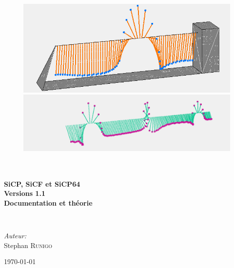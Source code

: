 \begin{titlepage}
\begin{center}
\begin{figure}[htbp]
\begin{minipage}[c]{.45\linewidth}
\begin{center}
\includegraphics[scale=0.25]{./titre/SiCP64}
\end{center}
\end{minipage}
\hfill
\begin{minipage}[c]{.45\linewidth}
\begin{center}
\includegraphics[scale=0.25]{./titre/SiCP}
\end{center}
\end{minipage}
\end{figure}

\textsc{\Large }\\[0.5cm]

\HRule \\[0.4cm]

{\huge \bfseries  SiCP, SiCF et SiCP64\\
  Versions 1.1\\
Documentation et théorie\\[0.4cm] }

\HRule \\[1.5cm]

\begin{minipage}{0.4\textwidth}
\begin{flushleft} \large
\end{flushleft}
\end{minipage}
\begin{minipage}{0.4\textwidth}
\begin{flushright} \large
\emph{Auteur:}\\
Stephan \textsc{Runigo}
\end{flushright}
\end{minipage}

\vfill

{\large \today}

\end{center}
\end{titlepage}
